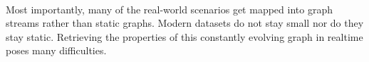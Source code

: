 \paragraph{}
Most importantly, many of the real-world scenarios get mapped into graph streams rather than static graphs. Modern datasets do not stay small nor do they stay static. Retrieving the properties of this constantly evolving graph in realtime poses many difficulties\cite{kumarage_efficient_2017}.